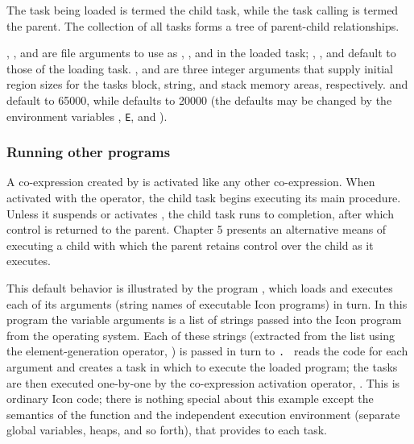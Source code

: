 The task being loaded is termed the child task, while the task calling
 is termed the parent. The
collection of all tasks forms a tree of parent-child
relationships.

, ,
and \textstyleSourceText{ }are file
arguments to use as ,
, and
 in the loaded task;
,
, and
\textstyleSourceText{\textrm{
}}default to those of the loading task.\textstyleSourceText{\textrm{
}} ,
and  are three integer arguments that
supply initial region sizes for the task{\textquotesingle}s block,
string, and stack memory areas, respectively.
 and 
default to 65000, while defaults to
20000 (the defaults may be changed by the environment variables
,
\texttt{E}, and
). 

\subsubsection{Running other programs}

A co-expression created by  is
activated like any other co-expression. When activated with the
 operator, the child task begins
executing its main procedure. Unless it suspends or activates
, the child task runs to
completion, after which control is returned to the parent. Chapter 5
presents an alternative means of executing a child with which the
parent retains control over the child as it executes. 

This default behavior is illustrated by the program
, which loads and executes each
of its arguments (string names of executable Icon programs) in turn. In
this program the variable arguments is a list of strings passed into
the Icon program from the operating system. Each of these strings
(extracted from the list using the element-generation operator,
\textstyleSourceText{\texttt{!}}) is passed in turn to
\texttt{.
} reads the code for each argument
and creates a task in which to execute the loaded program; the tasks
are then executed one-by-one by the co-expression activation operator,
. This is ordinary Icon code; there is
nothing special about this example except the semantics of the
 function and the independent
execution environment (separate global variables, heaps, and so forth),
that \textstyleSourceText{
}provides to each task. 

